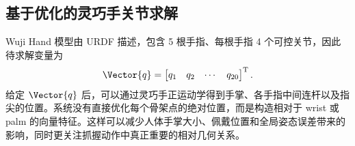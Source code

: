 \subsection{基于优化的灵巧手关节求解}
Wuji Hand 模型由 URDF 描述，包含 5 根手指、每根手指 4 个可控关节，因此待求解变量为
\begin{equation}
    \Vector{q}=
    \begin{bmatrix}
        q_1 & q_2 & \cdots & q_{20}
    \end{bmatrix}^{\mathrm{T}} .
\end{equation}
给定 $\Vector{q}$ 后，可以通过灵巧手正运动学得到手掌、各手指中间连杆以及指尖的位置。系统没有直接优化每个骨架点的绝对位置，而是构造相对于 wrist 或 palm 的向量特征。这样可以减少人体手掌大小、佩戴位置和全局姿态误差带来的影响，同时更关注抓握动作中真正重要的相对几何关系。

